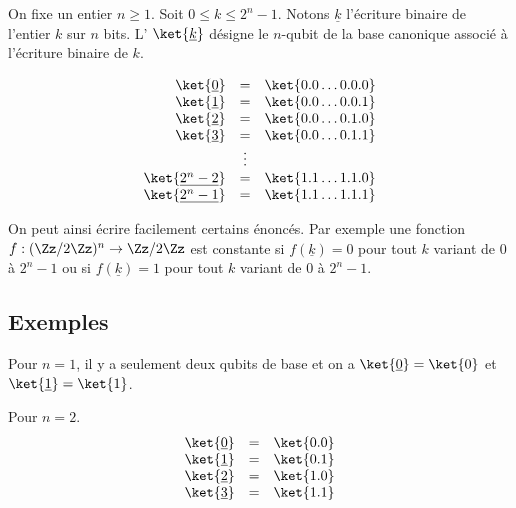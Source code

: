 \documentclass[11pt,class=report,crop=false]{standalone}
\begin{document}
On fixe un entier $n\ge1$. Soit $0 \le k \le 2^{n}-1$. 
Notons $\underline{k}$ l'écriture binaire de l'entier $k$ sur $n$ bits.
L' $\ket{\underline{k}}$ désigne le $n$-qubit de la base canonique associé à l'écriture binaire de $k$.

$$\begin{array}{rcl}
\ket{\underline{0}} &=& \ket{0.0\ldots0.0.0} \\
\ket{\underline{1}} &=& \ket{0.0\ldots0.0.1} \\
\ket{\underline{2}} &=& \ket{0.0\ldots0.1.0} \\
\ket{\underline{3}} &=& \ket{0.0\ldots0.1.1} \\
& \vdots &  \\
\ket{\underline{2^{n}-2}} &=& \ket{1.1\ldots1.1.0} \\
\ket{\underline{2^{n}-1}} &=& \ket{1.1\ldots1.1.1} \\
\end{array}
$$

\medskip

On peut ainsi écrire facilement certains énoncés. Par exemple une fonction
$f : (\Zz/2\Zz)^n \to \Zz/2\Zz$ est constante si
$f(\underline{k})=0$ pour tout $k$ variant de $0$ à $2^n-1$
ou si $f(\underline{k})=1$ pour tout $k$ variant de $0$ à $2^n-1$.
\subsection{Exemples}

Pour $n=1$, il y a seulement deux qubits de base et on a 
$\ket{\underline{0}} = \ket{0}$ et $\ket{\underline{1}} = \ket{1}$.

\begin{exemple}
Pour $n = 2$.
$$\begin{array}{rcl}
\ket{\underline{0}} &=& \ket{0.0} \\
\ket{\underline{1}} &=& \ket{0.1} \\
\ket{\underline{2}} &=& \ket{1.0} \\
\ket{\underline{3}} &=& \ket{1.1} \\
\end{array}
$$
\end{exemple}
\end{document}
